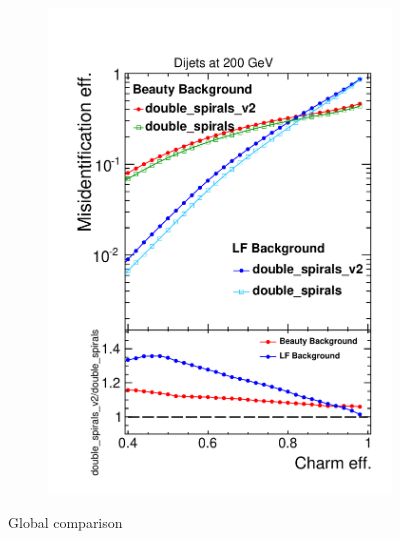 \begin{figure}[H]
\begin{subfigure}[b]{0.5\textwidth}
          \includegraphics[width=\textwidth]{Figures/ImpactOfGeometries/heavy_general_200_Charm.pdf}
          \caption{}
          \label{}
        \end{subfigure}
        \caption{Global comparison}\label{fig:heavy_200}
\end{figure}
